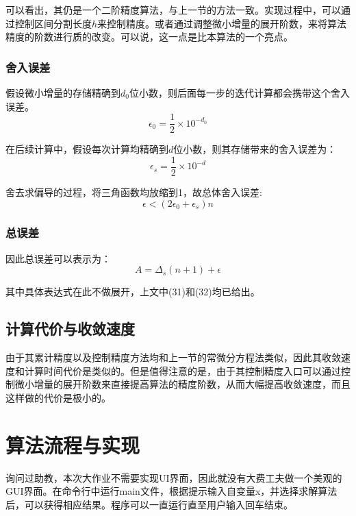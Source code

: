 \documentclass[UTF8]{ctexart}
\begin{document}
可以看出，其仍是一个二阶精度算法，与上一节的方法一致。实现过程中，可以通过控制区间分割长度$h$来控制精度。或者通过调整微小增量的展开阶数，来将算法精度的阶数进行质的改变。可以说，这一点是比本算法的一个亮点。

\subsubsection{舍入误差}

假设微小增量的存储精确到$d_0$位小数，则后面每一步的迭代计算都会携带这个舍入误差。$$\epsilon_0 = \frac{1}{2}\times 10^{-d_0}$$

在后续计算中，假设每次计算均精确到$d$位小数，则其存储带来的舍入误差为：$$\epsilon_s = \frac{1}{2}\times 10^{-d}$$

舍去求偏导的过程，将三角函数均放缩到1，故总体舍入误差:
\begin{equation}
    \epsilon < (2\epsilon_0+\epsilon_s)n
\end{equation}

\subsubsection{总误差}

因此总误差可以表示为：
\begin{equation}
    A = \Delta_s(n+1) +\epsilon
\end{equation}

其中具体表达式在此不做展开，上文中(31)和(32)均已给出。


\subsection{计算代价与收敛速度}

由于其累计精度以及控制精度方法均和上一节的常微分方程法类似，因此其收敛速度和计算时间代价是类似的。但是值得注意的是，由于其控制精度入口可以通过控制微小增量的展开阶数来直接提高算法的精度阶数，从而大幅提高收敛速度，而且这样做的代价是极小的。
\section{算法流程与实现}

询问过助教，本次大作业不需要实现UI界面，因此就没有大费工夫做一个美观的GUI界面。在命令行中运行main文件，根据提示输入自变量x，并选择求解算法后，可以获得相应结果。程序可以一直运行直至用户输入回车结束。
\end{document}
